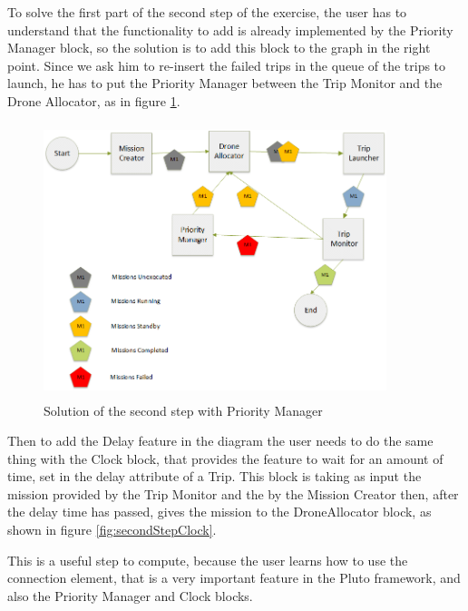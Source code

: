 \newpage

To solve the first part of the second step of the exercise, the user has to understand that the functionality to add is already implemented by the Priority Manager block, so the solution is to add this block to the graph in the right point.
Since we ask him to re-insert the failed trips in the queue of the trips to launch, he has to put the Priority Manager between the Trip Monitor and the Drone Allocator, as in figure \ref{fig:secondStepPriority}.
\\

\newpage

\begin{figure}[htb]
  \centering
  \includegraphics[width=10cm,height=8cm]{pictures/secondStep.png}
  \caption{Solution of the second step with Priority Manager}
  \label{fig:secondStepPriority}
\end{figure}

Then to add the Delay feature in the diagram the user needs to do the same thing with the Clock block, that provides the feature to wait for an amount of time, set in the delay attribute of a Trip. This block is taking as input the mission provided by the Trip Monitor and the by the Mission Creator then, after the delay time has passed, gives the mission to the DroneAllocator block, as shown in figure \ref{fig:secondStepClock}.

This is a useful step to compute, because the user learns how to use the connection element, that is a very important feature in the Pluto framework, and also the Priority Manager and Clock blocks.
\\

\newpage

